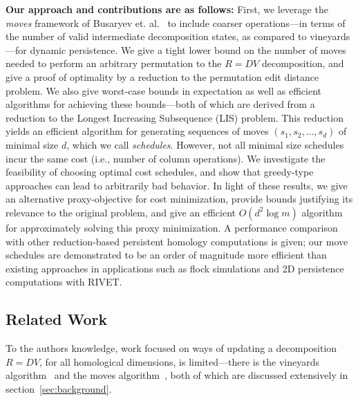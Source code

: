 \documentclass{article} %
\begin{document}
\textbf{Our approach and contributions are as follows:} First, we leverage the \emph{moves} framework of Busaryev et. al.~\cite{busaryev2010tracking} to include  coarser  operations---in terms of the number of valid intermediate decomposition states, as compared to vineyards---for dynamic persistence. 
We give a tight lower bound on the number of moves needed to perform an arbitrary permutation to the $R = D V$ decomposition, and give a proof of optimality by a reduction to the permutation edit distance problem.
We also give worst-case bounds in expectation as well as efficient algorithms for achieving these bounds---both of which are derived from a reduction to the Longest Increasing Subsequence (LIS) problem. 
This reduction yields an efficient algorithm for generating sequences of moves $( s_1, s_2, \dots, s_d )$ of minimal size $d$, which we call \emph{schedules}. 
However, not all minimal size schedules incur the same  cost 
(i.e., number of column operations).
We investigate the feasibility of choosing optimal cost schedules, and show that 
greedy-type approaches can lead to arbitrarily bad behavior. 
In light of these results, we give an alternative proxy-objective for cost minimization, provide bounds justifying its relevance to the original problem, and give an efficient $O(d^2 \log m)$ algorithm for approximately solving this proxy minimization. 
A performance comparison with other reduction-based persistent homology computations is given; 
our move schedules are demonstrated to be an order of magnitude more efficient than existing approaches in applications such as flock simulations and 2D persistence computations with RIVET. 
   
\subsection{Related Work}\label{sec:related_work} 
To the authors knowledge, work focused on ways of updating a  decomposition $R = DV$, for all homological dimensions, is limited---there is the vineyards algorithm~\cite{cohen2006vines} and the moves algorithm~\cite{busaryev2010tracking}, both of which are discussed extensively in section~\ref{sec:background}. 
\end{document}
